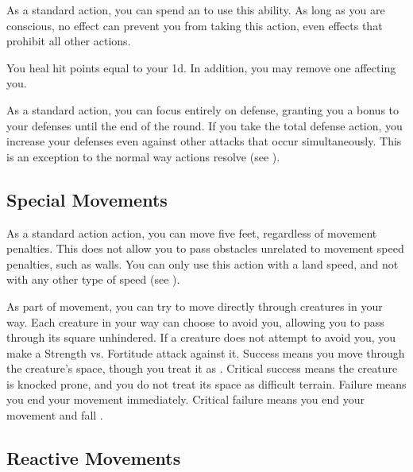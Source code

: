         \label{Recover}
        As a standard action, you can spend an  to use this ability.
        As long as you are conscious, no effect can prevent you from taking this action, even effects that prohibit all other actions.
        \begin{ability}
            \begin{spelleffects}
                \spelleffect You heal hit points equal to your  \minus1d.
                In addition, you may remove one  affecting you.
            \end{spelleffects}
        \end{ability}

        \label{Total Defense}
        As a standard action, you can focus entirely on defense, granting you a  bonus to your defenses until the end of the round.
        If you take the total defense action, you increase your defenses even against other attacks that occur simultaneously.
        This is an exception to the normal way actions resolve (see ).

    \subsection{Special Movements}

         As a standard action action, you can move five feet, regardless of movement penalties.
        This does not allow you to pass obstacles unrelated to movement speed penalties, such as walls.
        You can only use this action with a land speed, and not with any other type of speed (see ).

        \label{Overrun} As part of movement, you can try to move directly through creatures in your way.
        Each creature in your way can choose to avoid you, allowing you to pass through its square unhindered.
        If a creature does not attempt to avoid you, you make a Strength vs. Fortitude attack against it.
        Success means you move through the creature's space, though you treat it as .
        Critical success means the creature is knocked prone, and you do not treat its space as difficult terrain.
        Failure means you end your movement immediately.
        Critical failure means you end your movement and fall \prone.

    \subsection{Reactive Movements}

